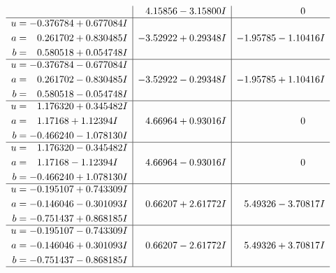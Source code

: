 \documentclass[1p]{elsarticle_modified}
\theoremstyle{definition}
\begin{document}
$$\begin{array}{c|c|c}
 & \phantom{-}4.15856 - 3.15800 I & \phantom{-0.000000 } 0 \\ \hline\begin{aligned}
u &= -0.376784 + 0.677084 I \\
a &= \phantom{-}0.261702 + 0.830485 I \\
b &= \phantom{-}0.580518 + 0.054748 I\end{aligned}
 & -3.52922 + 0.29348 I & -1.95785 - 1.10416 I \\ \hline\begin{aligned}
u &= -0.376784 - 0.677084 I \\
a &= \phantom{-}0.261702 - 0.830485 I \\
b &= \phantom{-}0.580518 - 0.054748 I\end{aligned}
 & -3.52922 - 0.29348 I & -1.95785 + 1.10416 I \\ \hline\begin{aligned}
u &= \phantom{-}1.176320 + 0.345482 I \\
a &= \phantom{-}1.17168 + 1.12394 I \\
b &= -0.466240 - 1.078130 I\end{aligned}
 & \phantom{-}4.66964 + 0.93016 I & \phantom{-0.000000 } 0 \\ \hline\begin{aligned}
u &= \phantom{-}1.176320 - 0.345482 I \\
a &= \phantom{-}1.17168 - 1.12394 I \\
b &= -0.466240 + 1.078130 I\end{aligned}
 & \phantom{-}4.66964 - 0.93016 I & \phantom{-0.000000 } 0 \\ \hline\begin{aligned}
u &= -0.195107 + 0.743309 I \\
a &= -0.146046 - 0.301093 I \\
b &= -0.751437 + 0.868185 I\end{aligned}
 & \phantom{-}0.66207 + 2.61772 I & \phantom{-}5.49326 - 3.70817 I \\ \hline\begin{aligned}
u &= -0.195107 - 0.743309 I \\
a &= -0.146046 + 0.301093 I \\
b &= -0.751437 - 0.868185 I\end{aligned}
 & \phantom{-}0.66207 - 2.61772 I & \phantom{-}5.49326 + 3.70817 I\\
 \hline 
 \end{array}$$\newpage$$\begin{array}{c|c|c}  

\end{array}$$
\end{document}
